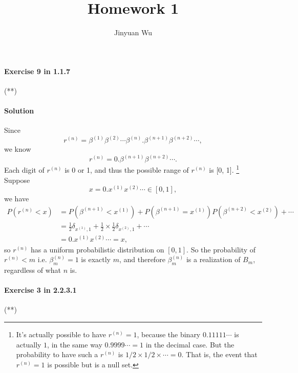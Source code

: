 \documentclass[hyperref, a4paper]{article}
\title{Homework 1}
\author{Jinyuan Wu}
\begin{document}
\maketitle

\paragraph{Exercise 9 in 1.1.7} (**)

\paragraph{Solution} Since 
\[
    r^{(n)} = \beta^{(1)} \beta^{(2)} \cdots \beta^{(n)} . \beta^{(n+1)} \beta^{(n+2)} \cdots,
\]
we know 
\begin{equation}
    r^{(n)} = 0. \beta^{(n + 1)} \beta^{(n+2)} \cdots.
\end{equation}
Each digit of $r^{(n)}$ is 0 or 1, 
and thus the possible range of $r^{(n)}$ is [0, 1].%
\footnote{
    It's actually possible to have $r^{(n)} = 1$,
    because the binary $0.11111\cdots$ is actually $1$,
    in the same way $0.9999\cdots = 1$ in the decimal case.
    But the probability to have such a $r^{(n)}$ is $1/2 \times 1/2 \times \cdots = 0$.
    That is, the event that $r^{(n)} = 1$ is possible but is a null set.
} 
Suppose 
\[
    x = 0.x^{(1)} x^{(2)} \cdots \in [0, 1],
\]
we have 
\[
    \begin{aligned}
        P(r^{(n)} < x) &= P(\beta^{(n+1)} < x^{(1)}) + P(\beta^{(n+1)} = x^{(1)}) P(\beta^{(n+2)} < x^{(2)}) + \cdots \\
        &= \frac{1}{2} \delta_{x^{(1)}, 1} + \frac{1}{2} \times \frac{1}{2} \delta_{x^{(2)}, 1} + \cdots \\
        &= 0.x^{(1)} x^{(2)} \cdots = x,
    \end{aligned}
\]
so $r^{(n)}$ has a uniform probabilistic distribution on $[0, 1]$.
So the probability of $r^{(n)} < m$ i.e. $\beta^{(n)}_m = 1$ is exactly $m$,
and therefore $\beta^{(n)}_m$ is a realization of $B_m$, regardless of what $n$ is.

\paragraph{Exercise 3 in 2.2.3.1} (**)  
\end{document}
